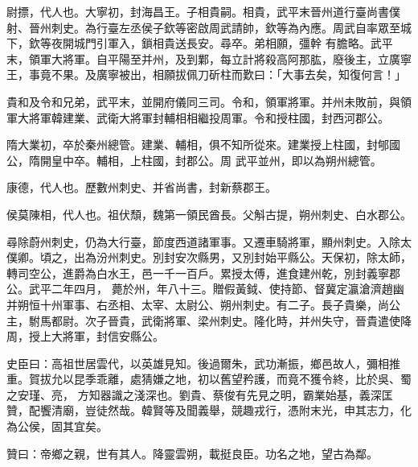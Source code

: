 \begin{pinyinscope}
 尉摽，代人也。大寧初，封海昌王。子相貴嗣。相貴，武平末晉州道行臺尚書僕射、晉州刺史。為行臺左丞侯子欽等密啟周武請帥，欽等為內應。周武自率眾至城下，欽等夜開城門引軍入，鎖相貴送長安。尋卒。弟相願，彊幹
 有膽略。武平末，領軍大將軍。自平陽至并州，及到鄴，每立計將殺高阿那肱，廢後主，立廣寧王，事竟不果。及廣寧被出，相願拔佩刀斫柱而歎曰：「大事去矣，知復何言！」



 貴和及令和兄弟，武平末，並開府儀同三司。令和，領軍將軍。并州未敗前，與領軍大將軍韓建業、武衛大將軍封輔相相繼投周軍。令和授柱國，封西河郡公。



 隋大業初，卒於秦州總管。建業、輔相，俱不知所從來。建業授上柱國，封郇國公，隋開皇中卒。輔相，上柱國，封郡公。周
 武平並州，即以為朔州總管。



 康德，代人也。歷數州刺史、并省尚書，封新蔡郡王。



 侯莫陳相，代人也。祖伏頹，魏第一領民酋長。父斛古提，朔州刺史、白水郡公。



 尋除蔚州刺史，仍為大行臺，節度西道諸軍事。又遷車騎將軍，顯州刺史。入除太僕卿。頃之，出為汾州刺史。別封安次縣男，又別封始平縣公。天保初，除太師，轉司空公，進爵為白水王，邑一千一百戶。累授太傅，進食建州乾，別封義寧郡公。武平二年四月，
 薨於州，年八十三。贈假黃鉞、使持節、督冀定瀛滄濟趙幽并朔恒十州軍事、右丞相、太宰、太尉公、朔州刺史。有二子。長子貴樂，尚公主，駙馬都尉。次子晉貴，武衛將軍、梁州刺史。隆化時，并州失守，晉貴遣使降周，授上大將軍，封信安縣公。



 史臣曰：高祖世居雲代，以英雄見知。後過爾朱，武功漸振，鄉邑故人，彌相推重。賀拔允以昆季乖離，處猜嫌之地，初以舊望矜護，而竟不獲令終，比於吳、蜀之安瑾、亮，
 方知器識之淺深也。劉貴、蔡俊有先見之明，霸業始基，義深匡贊，配饗清廟，豈徒然哉。韓賢等及聞義舉，競趣戎行，憑附末光，申其志力，化為公侯，固其宜矣。



 贊曰：帝鄉之親，世有其人。降靈雲朔，載挺良臣。功名之地，望古為鄰。



\end{pinyinscope}